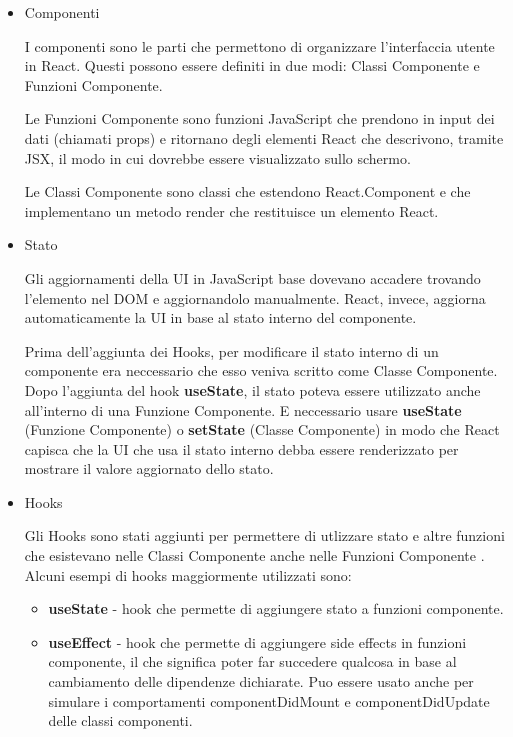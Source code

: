 \documentclass[a4paper,12pt]{report}
\begin{document}
				\begin{itemize}
				\item Componenti 

				I componenti sono le parti che permettono di organizzare l’interfaccia utente in React. Questi possono essere definiti in due modi: Classi Componente e Funzioni Componente. \cite{componentireact} 

				Le Funzioni Componente sono funzioni JavaScript che prendono in input dei dati (chiamati props) e ritornano degli elementi React che descrivono, tramite JSX, il modo in cui dovrebbe essere visualizzato sullo schermo. \cite{tipicomponenti} 

				Le Classi Componente sono classi che estendono React.Component e che implementano un metodo render che restituisce un elemento React. 

				\item Stato 

				Gli aggiornamenti della UI in JavaScript base dovevano accadere trovando l’elemento nel DOM e aggiornandolo manualmente. React, invece, aggiorna automaticamente la UI in base al stato interno del componente. 

Prima dell’aggiunta dei Hooks, per modificare il stato interno di un componente era neccessario che esso veniva scritto come Classe Componente. Dopo l’aggiunta del hook \textbf{useState}, il stato poteva essere utilizzato anche all’interno di una Funzione Componente. E neccessario usare \textbf{useState} (Funzione Componente) o \textbf{setState} (Classe Componente) in modo che React capisca che la UI che usa il stato interno debba essere renderizzato per mostrare il valore aggiornato dello stato. \cite{statoreact} 

				\item Hooks 

				Gli Hooks sono stati aggiunti per permettere di utlizzare stato e altre funzioni che esistevano nelle Classi Componente anche nelle Funzioni Componente \cite{hooksreact}. Alcuni esempi di hooks maggiormente utilizzati sono: 

				\begin{itemize}
				\item \textbf{useState} - hook che permette di aggiungere stato a funzioni componente.
				\item \textbf{useEffect} - hook che permette di aggiungere side effects in funzioni componente, il che significa poter far succedere qualcosa in base al cambiamento delle dipendenze dichiarate. Puo essere usato anche per simulare i comportamenti componentDidMount e componentDidUpdate delle classi componenti.


\end{itemize}
\end{itemize}
\end{document}
